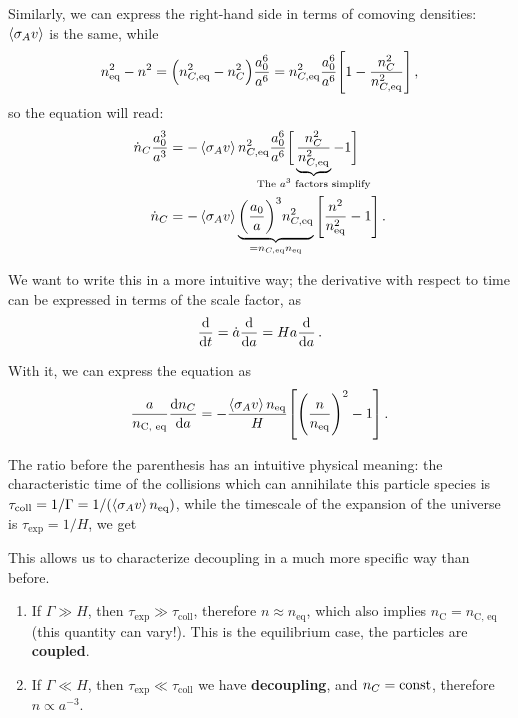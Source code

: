 \documentclass[main.tex]{subfiles}
\begin{document}
Similarly, we can express the right-hand side in terms of comoving densities: \(\expval{\sigma_A v}\) is the same, while 
%
\begin{align}
n _{\text{eq}}^2 - n^2 = \qty(n _{C, \text{eq}}^2 - n_C^2) \frac{a_0^{6}}{a^{6}}
= n _{C, \text{eq}}^2 \frac{a_0^{6}}{a^{6}} 
\qty[1 - \frac{n_C^2}{n _{C, \text{eq}}^2}]
\,,
\end{align}
%
so the equation will read:
%
\begin{align}
  \dot{n}_C \frac{a_0^3}{a^3} 
  &=
  -\expval{\sigma _A v} 
  n _{C, \text{eq}}^2 \frac{a_0^{6}}{a^{6}} 
\bigg[\underbrace{\frac{n_C^2}{n _{C, \text{eq}}^2}}_{\mathclap{\text{The \(a^3\) factors simplify}}} - 1\bigg] 
\\
  \dot{n}_C &= - 
  \expval{\sigma _A v } \underbrace{\qty(\frac{a_0 }{a})^3 n _{C, \text{eq}}^2}_{ = n_{C, \text{eq}} n _{\text{eq}}} \qty[\frac{n^2}{n _{ \text{eq}}^2} - 1] 
\,.
\end{align}

We want to write this in a more intuitive way; the derivative with respect to time can be expressed in terms of the scale factor, as 
%
\begin{align}
\dv{}{t} = \dot{a}\dv{}{a} = H a \dv{}{a}
\,.
\end{align}

With it, we can express the equation as 
%
\begin{align}
\frac{a}{n _{\text{C, eq}}} \dv{n_C}{a} = - \frac{\expval{\sigma _A v }n _{\text{eq}}}{H} \qty[\qty(\frac{n}{n _{\text{eq}}})^2- 1]
\,.
\end{align}
%

The ratio before the parenthesis has an intuitive physical meaning:
the characteristic time of the collisions which can annihilate this particle species is \(\tau _{\text{coll}} = 1/ \Gamma =  1 / (\expval{\sigma _A v} n _{\text{eq}})\), while the timescale of the expansion of the universe is \(\tau _{\text{exp}} = 1/H\), we get 

This allows us to characterize decoupling in a much more specific way than before.
\begin{enumerate}
  \item If \(\Gamma \gg H\), then \(\tau _{\text{exp}} \gg \tau _{\text{coll}} \), therefore \(n \approx n _{\text{eq}}\), which also implies \(n _{\text{C}} = n _{\text{C, eq}}\) (this quantity can vary!). This is the equilibrium case, the particles are \textbf{coupled}. 
  \item If \(\Gamma \ll H\), then \(\tau _{\text{exp}} \ll \tau _{\text{coll}} \) we have \textbf{decoupling}, and \(n_C = \text{const}\), therefore \(n \propto a^{-3}\).
\end{enumerate}
\end{document}
